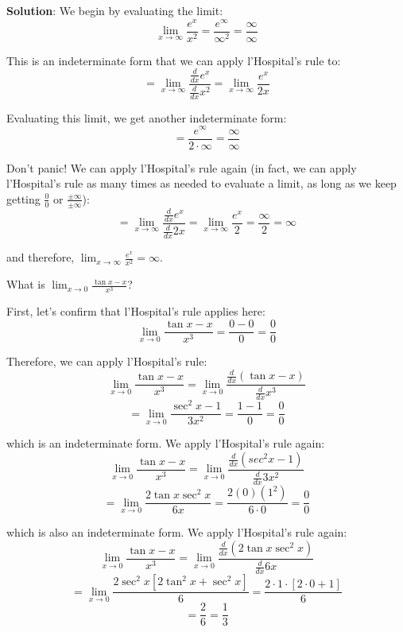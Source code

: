 \textbf{Solution}: We begin by evaluating the limit:
$$\lim_{x \to \infty} \frac{e^x}{x^2} = \frac{e^{\infty}}{\infty^2} = 
\frac{\infty}{\infty}$$

This is an indeterminate form that we can apply l'Hospital's rule to:
$$= \lim_{x \to \infty} \frac{\frac{d}{dx}e^x}{\frac{d}{dx}x^2} = \lim_{x \to 
\infty} \frac{e^x}{2x}$$

Evaluating this limit, we get another indeterminate form:
$$=\frac{e^{\infty}}{2 \cdot \infty} = \frac{\infty}{\infty}$$

Don't panic! We can apply l'Hospital's rule again (in fact, we can apply 
l'Hospital's rule as many times as needed to evaluate a limit, as long as we 
keep getting $\frac{0}{0}$ or $\frac{\pm \infty}{\pm \infty}$):
$$= \lim_{x \to \infty} \frac{\frac{d}{dx}e^x}{\frac{d}{dx}2x} = \lim_{x \to 
\infty} \frac{e^x}{2} = \frac{\infty}{2} = \infty$$

and therefore, $\lim_{x \to \infty} \frac{e^x}{x^2} = \infty$.

\begin{Exercise}[label=LH1]
What is $\lim_{x \to 0} \frac{\tan{x} - x}{x^3}$?
\end{Exercise}

\begin{Answer}[ref=LH1]
First, let's confirm that l'Hospital's rule applies here:
$$\lim_{x \to 0} \frac{\tan{x} - x}{x^3} = \frac{0 - 0}{0} = \frac{0}{0}$$

Therefore, we can apply l'Hospital's rule:
$$\lim_{x \to 0} \frac{\tan{x} - x}{x^3} = \lim_{x \to 0} \frac{\frac{d}{dx}(\tan{x} - x)}{\frac{d}{dx}x^3}$$
$$= \lim_{x \to 0} \frac{\sec^2{x} - 1}{3x^2} = \frac{1 - 1}{0} = \frac{0}{0}$$

which is an indeterminate form. We apply l'Hospital's rule again:
$$\lim_{x \to 0} \frac{\tan{x} - x}{x^3} = \lim_{x \to 0} \frac{\frac{d}{dx}(sec^2{x} - 1)}{\frac{d}{dx}3x^2}$$
$$= \lim_{x \to 0} \frac{2\tan{x}\sec^2{x}}{6x} = \frac{2(0)(1^2)}{6 \cdot 0} = \frac{0}{0}$$

which is also an indeterminate form. We apply l'Hospital's rule again:
$$\lim_{x \to 0} \frac{\tan{x} - x}{x^3} = \lim_{x \to 0} \frac{\frac{d}{dx}(2\tan{x}\sec^2{x})}{\frac{d}{dx}6x}$$
$$= \lim_{x \to 0} \frac{2\sec^2{x}[2\tan^2{x} + \sec^2{x}]}{6} = \frac{2 \cdot 1 \cdot [2 \cdot 0 + 1]}{6}$$
$$= \frac{2}{6} = \frac{1}{3}$$
\end{Answer}



